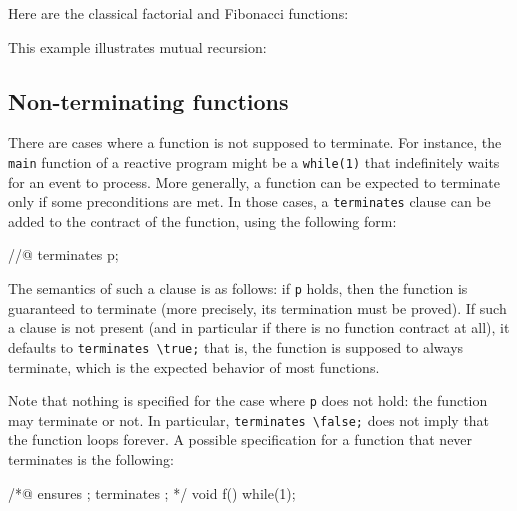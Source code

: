 \begin{example}
  Here are the classical factorial and Fibonacci functions:
\end{example}

\begin{example}
  This example illustrates mutual recursion:
\end{example}




\subsection{Non-terminating functions}
\label{sec:non-term-funct}
\experimental

There are cases where a function is not supposed to terminate. For
instance, the \lstinline|main| function of a reactive program might be a
\lstinline|while(1)| that indefinitely waits for an event to process. More
generally, a function can be expected to terminate only if some
preconditions are met. In those cases, a \lstinline|terminates| clause can
be added to the contract of the function, using the following form:

\begin{listing-nonumber}
//@ terminates p;
\end{listing-nonumber}

The semantics of such a clause is as follows: if \lstinline|p| holds, then the
function is guaranteed to terminate (more precisely, its
termination must be proved). If such a clause is not present (and in
particular if there is no function contract at all), it
defaults to \lstinline|terminates \true;| that is, the function is supposed
to always terminate, which is the expected behavior of most
functions.

Note that nothing is specified for the case where \lstinline|p| does not hold:
the function may terminate or not. In particular,
\lstinline|terminates \false;| does not imply that the function loops
forever. A possible specification for a function that never terminates
is the following:
\begin{listing}{1}
/*@ ensures \false;
    terminates \false;
*/
void f() { while(1); }
\end{listing}

